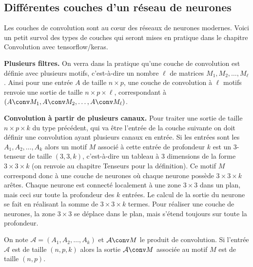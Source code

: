 \documentclass[11pt,class=report,crop=false]{standalone}
\begin{document}
\subsection{Différentes couches d'un réseau de neurones}

Les couches de convolution sont au c\oe ur des réseaux de neurones modernes. Voici un petit survol des types de couches qui seront mises en pratique dans le chapitre \og{}Convolution avec tensorflow/keras\fg{}.

\textbf{Plusieurs filtres.}
On verra dans la pratique qu'une couche de convolution est définie avec plusieurs motifs, c'est-à-dire un nombre $\ell$ de matrices $M_1, M_2,\ldots, M_\ell$.
Ainsi pour une entrée $A$ de taille $n \times p$, une couche de convolution à $\ell$ motifs renvoie une sortie de taille $n \times p \times \ell$, correspondant à 
$(A \conv M_1, A \conv M_2, \ldots, A \conv M_\ell)$.

   
\bigskip

\textbf{Convolution à partir de plusieurs canaux.}
Pour traiter une sortie de taille  $n \times p \times k$ du type précédent, qui va être l'entrée de la couche suivante on doit définir une convolution ayant plusieurs canaux en entrée. Si les entrées sont les $A_1, A_2,\ldots, A_k$ 
alors un motif $M$ associé à cette entrée de profondeur $k$ est
un $3$-tenseur de taille $(3, 3, k)$, c'est-à-dire un tableau à $3$ dimensions de la forme $3 \times 3 \times k$ (on renvoie au chapitre \og{}Tenseurs\fg{} pour la définition).
Ce motif $M$ correspond donc à une couche de neurones où chaque neurone possède $3\times3\times k$ arêtes. Chaque neurone est connecté localement à une zone $3\times 3$ dans un plan, mais ceci sur toute la profondeur des $k$ entrées. Le calcul de la sortie du neurone se fait en réalisant la somme de $3 \times 3 \times k$ termes. Pour réaliser une couche de neurones, la zone $3 \times 3$ se déplace dans le plan, mais s'étend toujours sur toute la profondeur.


On note $\mathcal{A} = (A_1, A_2,\ldots, A_k)$ et $\mathcal{A} \conv M$ le produit de convolution.
Si l'entrée $\mathcal{A}$ est de taille $(n,p,k)$ alors la sortie $\mathcal{A} \conv M$ associée au motif $M$ est de taille $(n,p)$.
\end{document}

